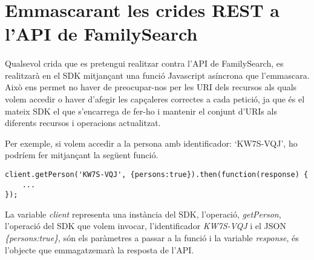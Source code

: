 \section{Emmascarant les crides REST a l'API de Family\-Search}

    \paragraph{}
    Qualsevol crida que es pretengui realitzar contra l’API de FamilySearch, es re\-a\-lit\-za\-rà en el SDK mitjançant una funció Javascript asíncrona que l'emmascara. Això ens permet no haver de preocupar-nos per les URI dels recursos als quals volem accedir o haver d'afegir les capçaleres correctes a cada petició, ja que és el mateix SDK el que s'encarrega de fer-ho i mantenir el conjunt d'URIs als diferents recursos i operacions actualitzat.

    Per exemple, si volem accedir a la persona amb identificador: `KW7S-VQJ', ho podríem fer mitjançant la següent funció.

\begin{lstlisting}[style=rawOwn,caption={Exempla crida emmascarada a l'API de FamilySearch}]
client.getPerson('KW7S-VQJ', {persons:true}).then(function(response) {
    ...
});
\end{lstlisting}

    La variable \emph{client} representa una instància del SDK, l’operació, \emph{getPerson}, l’o\-pe\-ra\-ció del SDK que volem invocar, l’identificador \emph{KW7S-VQJ} i el JSON \emph{\{persons:true\}}, són els paràmetres a passar a la funció i la variable \emph{response}, és l’objecte que emmagatzemarà la resposta de l’API.
